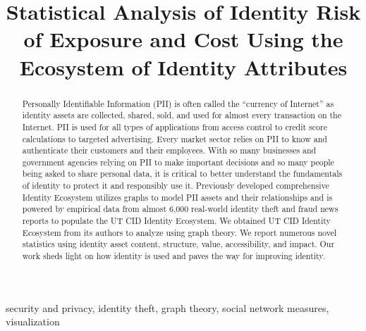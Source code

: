 \documentclass[conference]{IEEEtran}
\begin{document}
\title{Statistical  Analysis  of  Identity  Risk of Exposure  and  Cost  Using  the Ecosystem  of  Identity  Attributes
}

 \author{
 \and
 \and
 }

\maketitle

\begin{abstract}
Personally Identifiable Information (PII) is often called the ``currency of Internet'' as identity assets are collected, shared, sold, and used for almost every transaction on the Internet.  PII is used for all types of applications from access control to credit score calculations to targeted advertising.  Every market sector relies on PII to know and authenticate their customers and their employees.   With so many businesses and government agencies relying on PII to make important decisions and so many people being asked to share personal data, it is critical to better understand the fundamentals of identity to protect it and responsibly use it.  Previously developed  comprehensive Identity Ecosystem utilizes graphs to model PII assets and their relationships and is powered by empirical data from almost 6,000 real-world identity theft and fraud news reports to populate the UT CID Identity Ecosystem. We obtained UT CID Identity Ecosystem from its authors to analyze using graph theory. We report numerous novel statistics using identity asset content, structure, value, accessibility, and impact.  Our work sheds light on how identity is used and paves the way for improving identity.
\end{abstract}

\begin{IEEEkeywords}
security and privacy, identity theft, graph theory, social network measures,  visualization
\end{IEEEkeywords}
\end{document}
